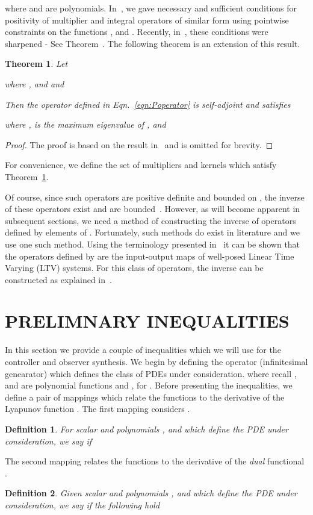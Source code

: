 \documentclass[US letter, 9 pt, conference]{ieeeconf}  \usepackage{setspace}
\newtheorem{theorem}{Theorem}
\newtheorem{definition}{Definition}
\begin{document}
where  and  are polynomials.  In~\cite{peet2008using}, we gave necessary and sufficient conditions for positivity of multiplier and integral operators of similar form using pointwise constraints on the functions ,  and . Recently, in~\cite{peetlmi}, these conditions were sharpened - See Theorem~. The following theorem is an extension of this result.
\begin{theorem}\label{thm:jointpos}
Let

where ,  and  and

Then the operator  defined in Eqn.~\eqref{eqn:Poperator} is  self-adjoint and satisfies

where ,  is the maximum eigenvalue of , and

\end{theorem}
\begin{proof}
The proof is based on the result in~\cite{peetlmi} and is omitted for brevity.
\end{proof}
For convenience, we define the set of multipliers and kernels which satisfy Theorem~\ref{thm:jointpos}.

Of course, since such operators are positive definite and bounded on , the inverse of these operators exist and are bounded~\cite{kreyszig1989introductory}. However, as will become apparent in subsequent sections, we need a method of constructing the inverse of operators defined by elements of . Fortunately, such methods do exist in literature and we use one such method. Using the terminology presented in~\cite{gohberg1984time} it can be shown that the operators defined by  are the input-output maps of well-posed Linear Time Varying (LTV) systems. For this class of operators, the inverse can be constructed as explained in~\cite{gohberg1984time}.
\section{PRELIMNARY INEQUALITIES}\label{sec:prelim}
In this section we provide a couple of inequalities which we will use for the controller and observer synthesis. We begin by defining the operator  (infinitesimal genearator) which defines the class of PDEs under consideration.
 where recall ,  and  are polynomial functions and , for . Before presenting the inequalities, we define a pair of mappings which relate the functions  to the derivative of the Lyapunov function . The first mapping considers .
\begin{definition}\label{def:dual}
For scalar  and polynomials ,  and  which define the PDE under consideration, we say  if

\end{definition}
The second mapping relates the functions  to the derivative of the \textit{dual} functional .
\begin{definition}\label{def:primal}
Given scalar  and polynomials ,  and  which define the PDE under consideration, we say  if the following hold

\end{definition}
\end{document}
